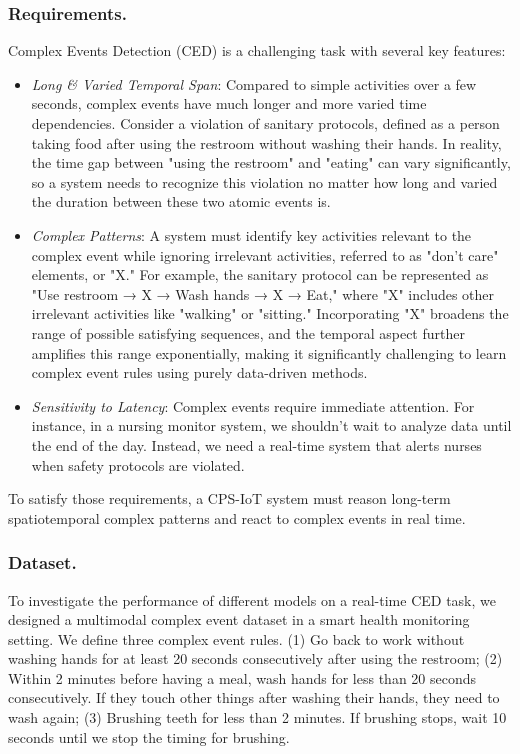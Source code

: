 \subsubsection{Requirements.}
Complex Events Detection (CED) is a challenging task with several key features:
\begin{itemize}%
    \item \textit{Long \& Varied Temporal Span}: Compared to simple activities over a few seconds, complex events have much longer and more varied time dependencies. Consider a violation of sanitary protocols, defined as a person taking food after using the restroom without washing their hands. In reality, the time gap between "using the restroom" and "eating" can vary significantly, so a system needs to recognize this violation no matter how long and varied the duration between these two atomic events is.
    
    \item \textit{Complex Patterns}: A system must identify key activities relevant to the complex event while ignoring irrelevant activities, referred to as "don’t care" elements, or "X." For example, the sanitary protocol can be represented as "Use restroom → X → Wash hands → X → Eat," where "X" includes other irrelevant activities like "walking" or "sitting." Incorporating "X" broadens the range of possible satisfying sequences, and the temporal aspect further amplifies this range exponentially, making it significantly challenging to learn complex event rules using purely data-driven methods. %
    
    \item \textit{Sensitivity to Latency}: Complex events require immediate attention. For instance, in a nursing monitor system, we shouldn't wait to analyze data until the end of the day. Instead, we need a real-time system that alerts nurses when safety protocols are violated.
\end{itemize}
To satisfy those requirements, a CPS-IoT system must reason long-term spatiotemporal complex patterns and react to complex events in real time.

\subsubsection{Dataset.}
To investigate the performance of different models on a real-time CED task, we designed a multimodal complex event dataset in a smart health monitoring setting. We define three complex event rules. (1) Go back to work without washing hands for at least 20 seconds consecutively after using the restroom; (2) Within 2 minutes before having a meal, wash hands for less than 20 seconds consecutively. If they touch other things after washing their hands, they need to wash again; (3) Brushing teeth for less than 2 minutes. If brushing stops, wait 10 seconds until we stop the timing for brushing.

